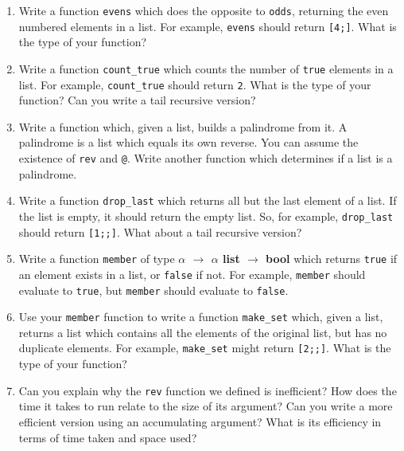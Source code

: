 \documentclass[]{book}
\begin{document}
\begin{enumerate}
  \item Write a function \texttt{evens} which does the opposite to \texttt{odds}, returning the even numbered elements in a list. For example, \texttt{evens\! [2;\! 4;\! 2;\! 4;\! 2]} should return \texttt{[4;]}. What is the type of your function?
  \item Write a function \texttt{count\_true} which counts the number of \texttt{true} elements in a list. For example, \texttt{count\_true} should return \texttt{2}. What is the type of your function? Can you write a tail recursive version?
  \item Write a function which, given a list, builds a palindrome from it. A palindrome is a list which equals its own reverse. You can assume the existence of \texttt{rev} and \texttt{@}. Write another function which determines if a list is a palindrome.
  \item Write a function \texttt{drop\_last} which returns all but the last element of a list. If the list is empty, it should return the empty list. So, for example, \texttt{drop\_last\! [1;\! 2;\! 4;\! 8]} should return \texttt{[1;;]}. What about a tail recursive version?
  \item Write a function \texttt{member} of type \textbf{\textrm {$\alpha$ $\rightarrow$ $\alpha$ list $\rightarrow$ bool}} which returns \texttt{true} if an element exists in a list, or \texttt{false} if not. For example, \texttt{member\! [1;\! 2;\! 3]} should evaluate to \texttt{true}, but \texttt{member\! [1;\! 2]} should evaluate to \texttt{false}. 
  \item Use your \texttt{member} function to write a function \texttt{make\_set} which, given a list, returns a list which contains all the elements of the original list, but has no duplicate elements. For example, \texttt{make\_set\! [1;\! 2;\! 3;\! 3;\! 1]} might return \texttt{[2;;]}. What is the type of your function?
  \item Can you explain why the \texttt{rev} function we defined is inefficient? How does the time it takes to run relate to the size of its argument? Can you write a more efficient version using an accumulating argument? What is its efficiency in terms of time taken and space used?
\end{enumerate}

\cleardoublepage
\thispagestyle{empty}
\chapter*{}
\\
\end{document}
